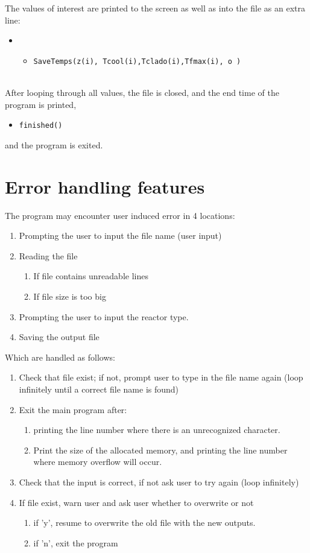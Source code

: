\documentclass[a4paper, 12pt]{article}
\begin{document}
The values of interest are printed to the screen as well as into the file as an extra line:
\begin{itemize}
	\item[]
	\begin{itemize}
	\item \texttt{\textcolor{subr}{SaveTemps}(z(i), Tcool(i),Tclado(i),Tfmax(i), o     )}
	\end  {itemize}
\end  {itemize}

\ \\
After looping through all values, the file is closed, and the end time of the program is printed,
\begin{itemize}
	\item \texttt{\textcolor{subr}{finished}()}
\end{itemize}
and the program is exited.

\section{Error handling features}
The program may encounter user induced error in 4 locations:
\begin{enumerate}
	\item Prompting the user to input the file name (user input)
	\item Reading the file
	\begin{enumerate}
		\item If file contains unreadable lines
		\item If file size is too big
	\end{enumerate}
	\item Prompting the user to input the reactor type.
	\item Saving the output file
\end  {enumerate}

Which are handled as follows:
\begin{enumerate}
	\item Check that file exist; if not, prompt user to type in the file name again (loop infinitely until a correct file name is found)
	\item Exit the main program after:
	\begin{enumerate}
		\item printing the line number where there is an unrecognized character.
		\item Print the size of the allocated memory, and printing the line number where memory overflow will occur.
	\end{enumerate}
	\item Check that the input is correct, if not ask user to try again (loop infinitely)
	\item If file exist, warn user and ask user whether to overwrite or not
	\begin{enumerate}
		\item if 'y', resume to overwrite the old file with the new outputs.
		\item if 'n', exit the program
	\end{enumerate}
\end  {enumerate}
\end{document}
